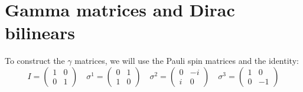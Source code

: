 \documentclass[a4paper,10pt]{article}
\begin{document}
\section{Gamma matrices and Dirac bilinears}
To construct the $\gamma$ matrices, we will use the Pauli spin matrices and the identity:
\begin{displaymath}
 I = \left(\begin{array}{cc} 1 & 0 \\ 0 & 1 \end{array}\right) \quad 
 \sigma^{1} = \left(\begin{array}{cc} 0 & 1 \\ 1 & 0 \end{array}\right) \quad 
 \sigma^{2} = \left(\begin{array}{cc} 0 & -i \\ i & 0 \end{array}\right) \quad 
 \sigma^{3} = \left(\begin{array}{cc} 1 & 0 \\ 0 & -1 \end{array}\right)
\end{displaymath}
\end{document}
